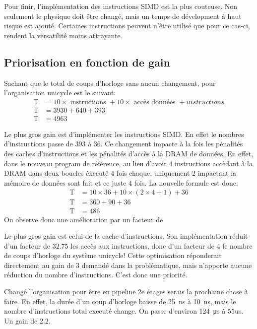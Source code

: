 \documentclass[a11paper]{article}
\newcommand{\todo}[1]{\begin{color}{Red}\textbf{TODO:} #1\end{color}}
\begin{document}
Pour finir, l'implémentation des instructions SIMD est la plus couteuse.
Non seulement le physique doit être changé, mais un temps de dévelopment à
haut risque est ajouté. Certaines instructions peuvent n'être utilisé que pour
ce cas-ci, rendent la versatilité moins attrayante.

\subsection{Priorisation en fonction de gain}
Sachant que le total de coups d'horloge sans aucun changement, pour
l'organisation unicycle est le suivant:
\begin{align}
  \text{T} &= 10\times\text{ instructions } + 10\times\text{ accès données } + instructions \\
  \text{T} &= 3930 + 640 + 393 \\
  \text{T} &= 4963
\end{align}

Le plus gros gain est d'implémenter les instructions SIMD. En effet le nombres
d'instructions passe de $393$ à $36$. Ce changement impacte à la fois les
pénalités des caches d'instructions et les pénalités d'accès à la DRAM de
données. En effet, dans le nouveau program de référence, au lieu d'avoir $4$
instructions accèdant à la DRAM dans deux boucles éxecuté $4$ fois chaque,
uniquement $2$ impactant la mémoire de données sont fait et ce juste $4$ fois.
La nouvelle formule est donc:
\begin{align}
  \text{T} &= 10\times36 + 10\times(2\times4+1) + 36 \\
  \text{T} &= 360 + 90 + 36 \\
  \text{T} &= 486
\end{align}
On observe donc une amélioration par un facteur de


Le plus gros gain est celui de la cache d'instructions. Son implémentation
réduit d'un facteur de $32.75$ les accès aux instructions, donc d'un facteur
de $4$ le nombre de coups d'horloge du système unicycle! Cette optimisation
réponderait directement au gain de $3$ demandé dans la problématique, mais
n'apporte aucune réduction du nombre d'instructions. C'est donc une priorité.

Changé l'organisation pour être en pipeline 2e étages serais la prochaine chose
à faire. En effet, la durée d'un coup d'horloge baisse de \SI{25}{\nano\s} à \SI{10}{\nano\s}, mais
le nombre d'instructions total executé change. On passe d'environ \SI{124}{\micro\s} à
$55$us. Un gain de $2.2$.

\end{document}
